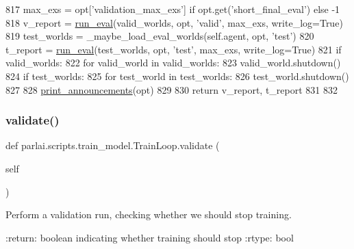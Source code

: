 \begin{DoxyCode}
817         max\_exs = opt[\textcolor{stringliteral}{'validation\_max\_exs'}] \textcolor{keywordflow}{if} opt.get(\textcolor{stringliteral}{'short\_final\_eval'}) \textcolor{keywordflow}{else} -1
818         v\_report = \hyperlink{namespaceparlai_1_1scripts_1_1train__model_a496dfe3bf04da9b55d261b4c8d6229a7}{run\_eval}(valid\_worlds, opt, \textcolor{stringliteral}{'valid'}, max\_exs, write\_log=\textcolor{keyword}{True})
819         test\_worlds = \_maybe\_load\_eval\_worlds(self.agent, opt, \textcolor{stringliteral}{'test'})
820         t\_report = \hyperlink{namespaceparlai_1_1scripts_1_1train__model_a496dfe3bf04da9b55d261b4c8d6229a7}{run\_eval}(test\_worlds, opt, \textcolor{stringliteral}{'test'}, max\_exs, write\_log=\textcolor{keyword}{True})
821         \textcolor{keywordflow}{if} valid\_worlds:
822             \textcolor{keywordflow}{for} valid\_world \textcolor{keywordflow}{in} valid\_worlds:
823                 valid\_world.shutdown()
824         \textcolor{keywordflow}{if} test\_worlds:
825             \textcolor{keywordflow}{for} test\_world \textcolor{keywordflow}{in} test\_worlds:
826                 test\_world.shutdown()
827 
828         \hyperlink{namespaceparlai_1_1core_1_1params_afd1a47c94990168ea9e70d894a79bd2c}{print\_announcements}(opt)
829 
830         \textcolor{keywordflow}{return} v\_report, t\_report
831 
832 
\end{DoxyCode}
\mbox{\label{classparlai_1_1scripts_1_1train__model_1_1TrainLoop_a707bb03792ef7427f5ddbb66184a9756}} 
\subsubsection{\texorpdfstring{validate()}{validate()}}
{\footnotesize\ttfamily def parlai.\+scripts.\+train\+\_\+model.\+Train\+Loop.\+validate (\begin{DoxyParamCaption}\item[{}]{self }\end{DoxyParamCaption})}

\begin{DoxyVerb}Perform a validation run, checking whether we should stop training.

:return: boolean indicating whether training should stop
:rtype: bool
\end{DoxyVerb}
 

